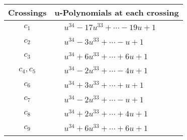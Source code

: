 \documentclass[1p]{elsarticle_modified}
\theoremstyle{definition}
\begin{document}
\begin{tabular}{m{50pt}|m{274pt}}
Crossings & \hspace{64pt}u-Polynomials at each crossing \\
\hline $$\begin{aligned}c_{1}\end{aligned}$$&$\begin{aligned}
&u^{34}-17 u^{33}+\cdots-19 u+1
\end{aligned}$\\
\hline $$\begin{aligned}c_{2}\end{aligned}$$&$\begin{aligned}
&u^{34}-3 u^{33}+\cdots- u+1
\end{aligned}$\\
\hline $$\begin{aligned}c_{3}\end{aligned}$$&$\begin{aligned}
&u^{34}+6 u^{33}+\cdots+6 u+1
\end{aligned}$\\
\hline $$\begin{aligned}c_{4},c_{5}\end{aligned}$$&$\begin{aligned}
&u^{34}-2 u^{33}+\cdots-4 u+1
\end{aligned}$\\
\hline $$\begin{aligned}c_{6}\end{aligned}$$&$\begin{aligned}
&u^{34}+3 u^{33}+\cdots+u+1
\end{aligned}$\\
\hline $$\begin{aligned}c_{7}\end{aligned}$$&$\begin{aligned}
&u^{34}-2 u^{33}+\cdots- u+1
\end{aligned}$\\
\hline $$\begin{aligned}c_{8}\end{aligned}$$&$\begin{aligned}
&u^{34}+2 u^{33}+\cdots+4 u+1
\end{aligned}$\\
\hline $$\begin{aligned}c_{9}\end{aligned}$$&$\begin{aligned}
&u^{34}+6 u^{33}+\cdots+6 u+1
\end{aligned}$\\

\end{tabular}
\end{document}
